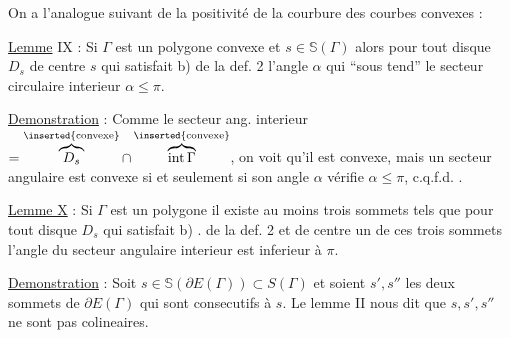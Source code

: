 \margin{$\unsure{\cdot|\bullet}$}
On a   l'analogue suivant de la positivité de la courbure des courbes  convexes :

\uline{Lemme} IX : Si $\Gamma$ est un polygone convexe et $s\in\mathbb{S}(\Gamma)$ alors pour tout disque $D_s$ de centre $s$ qui satisfait b) de la def. 2 l'angle $\alpha$ qui ``sous tend'' le secteur circulaire interieur  $\alpha\le\pi$.

\uline{Demonstration} : Comme le secteur ang. interieur $=\overbrace{D_s}^{\inserted{\text{convexe}}}\cap\overbrace{\operatorname{int}\Gamma}^{\inserted{\text{convexe}}}$, on voit qu'il est convexe, mais un secteur angulaire est convexe si et seulement si son angle $\alpha$ vérifie $\alpha\le\pi$, c.q.f.d. .


\uline{Lemme X} : Si $\Gamma$ est un polygone il existe au moins trois sommets tels que pour tout disque $D_s$ qui satisfait b) . de la def. 2 et de centre un de ces trois sommets l'angle du secteur angulaire interieur est inferieur à $\pi$.

\uline{Demonstration} : Soit $s\in\mathbb{S}(\partial E(\Gamma))\subset S(\Gamma)$ et soient $s',s''$ les deux sommets de $\partial E(\Gamma)$ qui sont consecutifs à $s$. Le lemme II nous dit que $s,s',s''$ ne sont pas colineaires.
